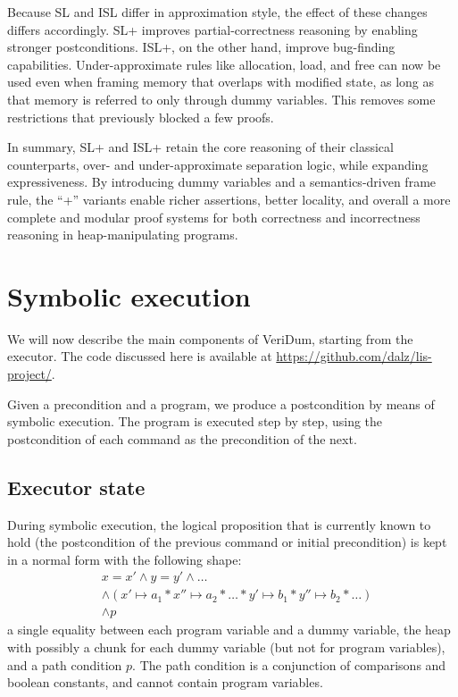 \documentclass[parskip=half]{scrartcl}
\begin{document}
Because SL and ISL differ in approximation style, the effect of these changes differs accordingly. SL+ improves partial-correctness reasoning by enabling stronger postconditions. ISL+, on the other hand, improve bug-finding capabilities. Under-approximate rules like allocation, load, and free can now be used even when framing memory that overlaps with modified state, as long as that memory is referred to only through dummy variables. This removes some restrictions that previously blocked a few proofs.

In summary, SL+ and ISL+ retain the core reasoning of their classical counterparts, over- and under-approximate separation logic, while expanding expressiveness. By introducing dummy variables and a semantics-driven frame rule, the ``+'' variants enable richer assertions, better locality, and overall a more complete and modular proof systems for both correctness and incorrectness reasoning in heap-manipulating programs.




\section{Symbolic execution}

We will now describe the main components of VeriDum, starting from the executor. The code discussed here is available at \url{https://github.com/dalz/lis-project/}.

Given a precondition and a program, we produce a postcondition by means of symbolic execution. The program is executed step by step, using the postcondition of each command as the precondition of the next.

\subsection{Executor state}

During symbolic execution, the logical proposition that is currently known to hold (\ie the postcondition of the previous command or initial precondition) is kept in a normal form with the following shape:
\begin{align*}
  &x = x' \wedge y = y' \wedge \dots \\
  &\wedge (x' \mapsto a_1 \ast x'' \mapsto a_2 \ast \dots \ast y' \mapsto b_1 \ast y'' \mapsto b_2 \ast \dots) \\
  &\wedge p
\end{align*}
\ie a single equality between each program variable and a dummy variable, the heap with possibly a chunk for each dummy variable (but not for program variables), and a path condition \(p\). The path condition is a conjunction of comparisons and boolean constants, and cannot contain program variables.
\end{document}
